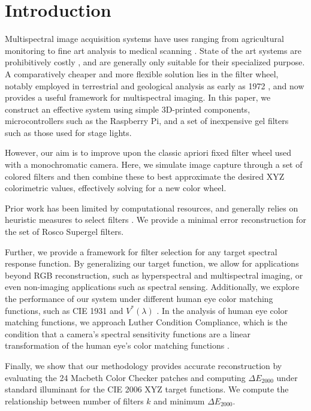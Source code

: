 \section{Introduction}
Multispectral image acquisition systems have uses ranging from agricultural monitoring to fine art analysis to medical scanning \cite{peyghambari2021lithological, ortega2019gastroenterology, mariotti2023forensics, qin2013foodsafety, wu2013foodfundamentals, lee2020colorluminance, wu2024headneckcancer, lu2020agriculture}{\color{red} .}
State of the art systems are prohibitively costly \cite{SCUTELNIC2024e00596}, and are generally only suitable for their specialized purpose.
A comparatively cheaper and more flexible solution lies in the filter wheel, notably employed in terrestrial and geological analysis as early as 1972 \cite{mannheimer1977landsat}, and now provides a useful framework for
multispectral imaging. 
In this paper, we construct an effective system using simple 3D-printed components, microcontrollers such as the Raspberry Pi, and a set of inexpensive gel filters such as those used for stage lights. 

However, our aim is to improve upon the classic apriori fixed filter wheel used with a monochromatic camera.
Here, we simulate image capture through a set of colored filters and then combine these to best approximate the desired XYZ colorimetric values, effectively solving for a new color wheel.

Prior work has been limited by computational resources, and generally relies on heuristic measures to select filters \cite{Filterselection, vrhel1994filter}.
We provide a minimal error reconstruction for the set of Rosco Supergel \cite{rosco_mycolor} filters.

Further, we provide a framework for filter selection for any target spectral response function. 
By generalizing our target function, we allow for applications beyond RGB reconstruction, such as hyperspectral and multispectral imaging, or even non-imaging applications such as spectral sensing.
Additionally, we explore the performance of our system under different human eye color matching functions, such as CIE 1931 \cite{1931TrOS...33...73S} and $V^{*}(\lambda)$ \cite{sharpe2005luminous}. 
In the analysis of human eye color matching functions, we approach Luther Condition Compliance, which is the condition that a camera's spectral sensitivity functions are a linear transformation of the human eye's color matching functions \cite{von1927gebiet}.

Finally, we show that our methodology provides accurate reconstruction by evaluating the 24 Macbeth Color Checker patches and computing $\Delta E_{2000}$ under standard illuminant for the CIE 2006 XYZ target functions. 
We compute the relationship between number of filters $k$ and minimum $\Delta E_{2000}$.




